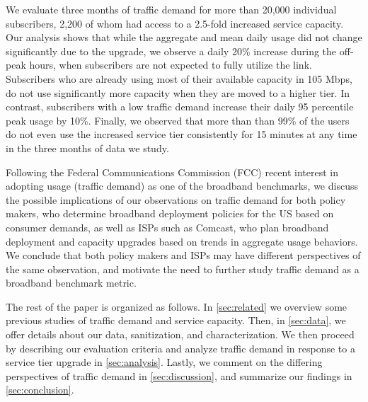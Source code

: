 We evaluate three months of traffic demand for more than 20,000 
individual subscribers, 2,200 of whom had access to a 2.5-fold increased 
service capacity. Our analysis shows that while the aggregate and mean daily 
usage did not change significantly due to the upgrade, we observe a daily 20\% 
increase during the off-peak hours, when subscribers are not expected to fully 
utilize the link.
Subscribers who are already using most of their 
available capacity in 105 Mbps, do not use significantly more capacity when
they are moved to a higher tier. In contrast, subscribers with a low traffic demand 
increase their daily 95 percentile peak usage by 10\%. Finally, we observed 
that more than than 99\% of the users do not even use the increased service 
tier consistently for 15 minutes at any time in the three months of data we 
study.

Following the Federal Communications Commission (FCC) recent interest in 
adopting usage (traffic demand) as one of the broadband benchmarks, we discuss 
the possible implications of our observations on traffic demand for both policy 
makers, who determine broadband deployment policies for the US based on consumer 
demands, as well as ISPs such as Comcast, who plan broadband deployment and 
capacity upgrades based on trends in aggregate usage behaviors. We conclude that 
both policy makers and ISPs may have different perspectives of the same 
observation, and motivate the need to further study traffic demand as a 
broadband benchmark metric.

The rest of the paper is organized as follows. In \autoref{sec:related} we 
overview some previous studies of traffic demand and service capacity. Then, in 
\autoref{sec:data}, we offer details about our data, sanitization, and 
characterization. We then proceed by describing our evaluation criteria and 
analyze traffic demand in response to a service tier upgrade in 
\autoref{sec:analysis}.
Lastly, we comment on the differing perspectives of traffic demand in 
\autoref{sec:discussion}, and summarize our findings in 
\autoref{sec:conclusion}.
